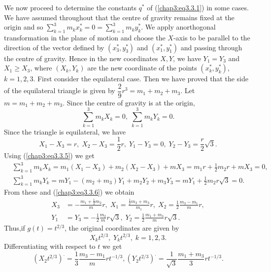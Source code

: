 We now proceed to determine the constants $q^*$ of
(\ref{chap3:eq3.3.1}) in some cases. We have assumed throughout that
the centre of gravity remains fixed at the origin and so
$\sum\limits^3_{k=1} m_k x^*_k = 0 = \sum\limits^3_{k=1} m_k
y^*_k$. We apply an\pageoriginale orthogonal transformation in the
plane of motion and choose the $X$-axis to be parallel to the
direction of the vector defined by $(x^*_3, y^*_3)$ and $(x^*_1,
y^*_1)$ and passing through the centre of gravity. Hence in the new
coordinates $X,Y$, we have $Y_1 = Y_3$ and $X_1 \geq X_3$, where
$(X_k, Y_k)$ are the new coordinate of the points $(x^*_k, y^*_k)$, $k
=1,2,3$. First consider the equilateral case. Then we have proved that
the side of the equilateral triangle is given by $\dfrac{2}{9} r^3 =
m_1 + m_2 + m_3$. Let $m = m_1 + m_2 + m_3$. Since the centre of
gravity is at the origin, 
\begin{equation*}
\sum\limits^3_{k=1} m_k X_k  = 0, \; \sum\limits^3_{k=1} m_k Y_k =
0. \tag{3.3.5}\label{chap3:eq3.3.5} 
\end{equation*}
Since the triangle is equilateral, we have
\begin{equation*}
X_1 - X_3 = r, \; X_2 - X_3 = \frac{1}{2} r, \; Y_1 - Y_3 = 0, \; Y_2
- Y_3 = \frac{r}{2} \sqrt{3}. \tag{3.3.6}\label{chap3:eq3.3.6} 
\end{equation*}
Using (\ref{chap3:eq3.3.5}) we get
{\fontsize{10}{12}\selectfont
\begin{align*}
& \sum\limits^3_{k=1} m_k X_k = m_1 (X_1 - X_3) + m_2 (X_2 - X_3) + m
  X_3 = m_1 r + \frac{1}{2} m_2 r + m X_3 = 0,\\ 
& \sum\limits^3_{k=1} m_k Y_k = mY_1 - (m_2+ m_3) Y_1 + m_2 Y_2 + m_3
  Y_3 = m Y_1 + \frac{1}{2} m_2 r \sqrt{3} = 0.  
\end{align*}}
From these and (\ref{chap3:eq3.3.6}) we obtain
\begin{align*}
X_3 & = - \frac{m_1 + \frac{1}{2} m_2}{m} r, \; X_1 =
\frac{\frac{1}{2} m_2 + m_3}{m_1} r, \; X_2 = \frac{1}{2} \frac{m_3 -
  m_1}{m} r, \tag{3.3.7}\label{chap3:eq3.3.7}\\ 
Y_1 & = Y_3 = - \frac{1}{2} \frac{m_2}{m} r \sqrt{3}, \; Y_2 =
\frac{1}{2} \frac{m_1 + m_3}{m}
r\sqrt{3}. \tag{3.3.8}\label{chap3:eq3.3.8} 
\end{align*}
Thus,\pageoriginale if $g(t) = t^{2/3}$, the original coordinates are
given by 
\begin{equation*}
X_k t^{2/3} , \; Y_k t^{2/3}, \; k =
1,2,3. \tag{3.3.9}\label{chap3:eq3.3.9} 
\end{equation*}
Differentiating with respect to $t$ we get
\begin{equation*}
(X_2 t^{2/3})^. = \frac{1}{3} \frac{m_3 - m_1}{m} rt^{-1/3}, (Y_2
  t^{2/3})^. =\frac{1}{\sqrt{3}}  \frac{m_1 + m_3}{3} rt^{-1/3}
  . \tag{3.3.10}\label{chap3:eq3.3.10} 
\end{equation*}

